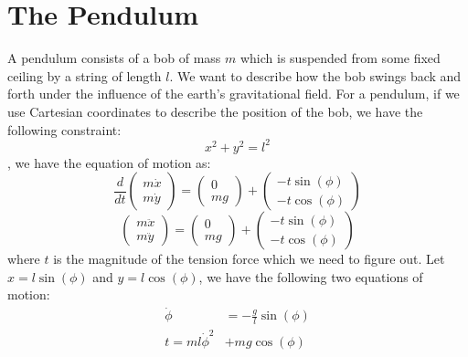 \section{The Pendulum}
A pendulum consists of a bob of mass $m$ which is suspended from some fixed ceiling by a string of length $l$. We want to describe how the bob swings back and forth under the influence of the earth's gravitational field. For a pendulum, if we use Cartesian coordinates to describe the position of the bob, we have the following constraint:
$$
x^{2}+y^{2}=l^{2}
$$
\textbf{}, we have the equation of motion as:
$$\frac{d}{d t}\left(\begin{array}{l}{m \dot{x}} \\ {m \dot{y}}\end{array}\right)=\left(\begin{array}{c}{0} \\ {m g}\end{array}\right)+\left(\begin{array}{l}{-t \sin (\phi)} \\ {-t \cos (\phi)}\end{array}\right)$$
$$
\left(\begin{array}{c}
{m \ddot{x}} \\
{m \ddot{y}}
\end{array}\right)=\left(\begin{array}{c}
{0} \\
{m g}
\end{array}\right)+\left(\begin{array}{c}
{-t \sin (\phi)} \\
{-t \cos (\phi)}
\end{array}\right)
$$
where $t$ is the magnitude of the tension force which we need to figure out. Let $x=l \sin (\phi)$ and $y=l \cos (\phi)$, we have the following two equations of motion:
\begin{equation}
\begin{aligned}
\dot{\phi} &=-\frac{g}{l} \sin (\phi) \\
t=m l \dot{\phi}^{2} &+m g \cos (\phi)
\end{aligned}
\end{equation}

